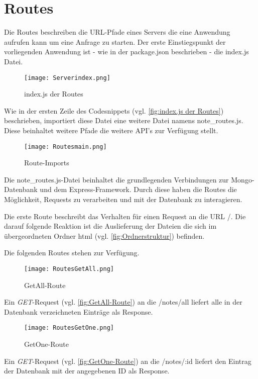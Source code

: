 
\chapter{Routes}
\label{ch:Routes}
Die Routes beschreiben die URL-Pfade eines Servers die eine Anwendung aufrufen kann um eine Anfrage zu starten.
Der erste Einstiegspunkt der vorliegenden Anwendung ist - wie in der package.json beschrieben - die index.js Datei.

\begin{figure}[h]
\texttt{[image: Serverindex.png]}
\vspace{3pt}
\caption{index.js der Routes}
\label{fig:index.js der Routes}
\end{figure}

Wie in der ersten Zeile des Codesnippets (vgl. \autoref{fig:index.js der Routes}) beschrieben, importiert diese Datei eine weitere Datei namens \glqq note\_routes.js\grqq{}. Diese beinhaltet weitere Pfade die weitere \acs{API}'s zur Verfügung stellt.

\begin{figure}[h]
\texttt{[image: Routesmain.png]}
\vspace{3pt}
\caption{Route-Imports}
\label{fig:Route-Imports}
\end{figure}

Die \glqq note\_routes.js\grqq -Datei beinhaltet die grundlegenden Verbindungen zur Mongo-Datenbank und dem Express-Framework. Durch diese haben die Routes die Möglichkeit, Requests zu verarbeiten und mit der Datenbank zu interagieren.

Die erste Route beschreibt das Verhalten für einen Request an die URL \glqq /\grqq . Die darauf folgende Reaktion ist die Auslieferung der Dateien die sich im übergeordneten Ordner \glqq html \grqq{}(vgl. \autoref{fig:Ordnerstruktur}) befinden.

Die folgenden Routes stehen zur Verfügung.
\begin{center}
\begin{figure}[h!]
\texttt{[image: RoutesGetAll.png]}
\vspace{1pt}
\caption{GetAll-Route}
\label{fig:GetAll-Route}
\end{figure}
\end{center}
Ein \textit{GET}-Request (vgl. \autoref{fig:GetAll-Route}) an die \glqq /notes/all\grqq{} liefert alle in der Datenbank verzeichneten Einträge als Response.
\begin{center}
\begin{figure}[h!]
\centering
\texttt{[image: RoutesGetOne.png]}
\vspace{1pt}
\caption{GetOne-Route}
\label{fig:GetOne-Route}
\end{figure}
\end{center}
Ein \textit{GET}-Request (vgl. \autoref{fig:GetOne-Route})  an die \glqq /notes/:id\grqq{} liefert den Eintrag der Datenbank mit der angegebenen ID als Response.

